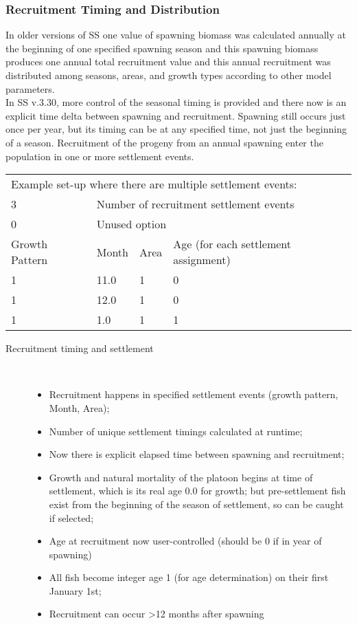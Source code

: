 \subsubsection{Recruitment Timing and Distribution}
In older versions of SS one value of spawning biomass was calculated annually at the beginning of one specified spawning season and this spawning biomass produces one annual total recruitment value and this annual recruitment was distributed among seasons, areas, and growth types according to other model parameters.\\ 

In SS v.3.30, more control of the seasonal timing is provided and there now is an explicit time delta between spawning and recruitment. Spawning still occurs just once per year, but its timing can be at any specified time, not just the beginning of a season.  Recruitment of the progeny from an annual spawning enter the population in one or more settlement events.  

\begin{center}
	\begin{tabular}{p{2cm} p{2cm} p{2cm} p{4cm}}
		\multicolumn{4}{l}{Example set-up where there are multiple settlement events:}\\
		3 & \multicolumn{3}{l}{Number of recruitment settlement events}\\
		0 & \multicolumn{3}{l}{Unused option}\\
		\hline
		Growth Pattern & Month & Area & Age (for each settlement assignment)\\
		\hline
		1 & 11.0 & 1 & 0 \\
		1 & 12.0 & 1 & 0 \\
		1 & 1.0  & 1 & 1 \\
		\hline
	\end{tabular}		
\end{center}

\begin{description}
	\item[Recruitment timing and settlement]\
	\begin{itemize}
		\item Recruitment happens in specified settlement events (growth pattern, Month, Area);
		\item Number of unique settlement timings calculated at runtime;
		\item Now there is explicit elapsed time between spawning and recruitment;
		\item Growth and natural mortality of the platoon begins at time of settlement, which is its real age 0.0 for growth; but pre-settlement fish exist from the beginning of the season of settlement, so can be caught if selected;
		\item Age at recruitment now user-controlled (should be 0 if in year of spawning)
		\item All fish become integer age 1 (for age determination) on their first January 1st;
		\item Recruitment can occur >12 months after spawning		
	\end{itemize}
\end{description}

